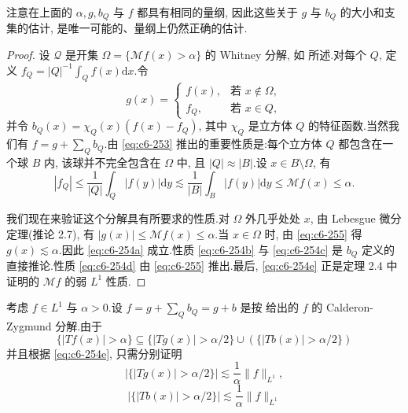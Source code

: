\begin{remark*}
注意在上面的 $\alpha, g, b_Q$ 与 $f$ 都具有相同的量纲, 因此这些关于 $g$ 与 $b_Q$ 的大小和支集的估计, 是唯一可能的、量纲上仍然正确的估计.
\end{remark*}

\begin{proof}
设 $\mathcal{Q}$ 是开集 $\Omega = \{\mathcal{M} f(x) > \alpha\}$ 的 Whitney 分解, 如 所述.对每个 $Q$, 定义 $f_Q = |Q|^{-1} \int_Q f(x) \mathrm{d}x$.令
\[
g(x) = \left\{ \begin{array}{ll} f(x), & \text{若 } x \notin \Omega, \\ f_Q, & \text{若 } x \in Q, \end{array} \right.
\]
并令 $b_Q(x) = \chi_Q(x) (f(x) - f_Q)$, 其中 $\chi_Q$ 是立方体 $Q$ 的特征函数.当然我们有 $f = g + \sum_Q b_Q$.由 \eqref{eq:c6-253} 推出的重要性质是:每个立方体 $Q$ 都包含在一个球 $B$ 内, 该球并不完全包含在 $\Omega$ 中, 且 $|Q| \approx |B|$.设 $x \in B \setminus \Omega$, 有
\begin{equation}
|f_Q| \leq \frac{1}{|Q|} \int_Q |f(y)| \mathrm{d}y \lesssim \frac{1}{|B|} \int_B |f(y)| \mathrm{d}y \leq \mathcal{M} f(x) \leq \alpha.\label{eq:c6-255}
\end{equation}

我们现在来验证这个分解具有所要求的性质.对 $\Omega$ 外几乎处处 $x$, 由 Lebesgue 微分定理(推论 2.7), 有 $|g(x)| \leq \mathcal{M} f(x) \leq \alpha$.当 $x \in \Omega$ 时, 由 \eqref{eq:c6-255} 得 $g(x) \lesssim \alpha$.因此 \eqref{eq:c6-254a} 成立.性质 \eqref{eq:c6-254b} 与 \eqref{eq:c6-254c} 是 $b_Q$ 定义的直接推论.性质 \eqref{eq:c6-254d} 由 \eqref{eq:c6-255} 推出.最后, \eqref{eq:c6-254e} 正是定理 2.4 中证明的 $\mathcal{M} f$ 的弱 $L^1$ 性质.
\end{proof}

考虑 $f \in L^1$ 与 $\alpha > 0$.设 $f = g + \sum_Q b_Q = g + b$ 是按 给出的 $f$ 的 Calderon-Zygmund 分解.由于
\[
\{|Tf(x)| > \alpha\} \subseteq \{|Tg(x)| > \alpha/2\} \cup (\{|Tb(x)| > \alpha/2\})
\]
并且根据 \eqref{eq:c6-254e}, 只需分别证明
\begin{equation}
|\{|Tg(x)| > \alpha/2\}| \lesssim \frac{1}{\alpha} \|f\|_{L^1}, \label{eq:c6-256}
\end{equation}
\begin{equation}
|\{|Tb(x)| > \alpha/2\}| \lesssim \frac{1}{\alpha} \|f\|_{L^1}\label{eq:c6-257}
\end{equation}

